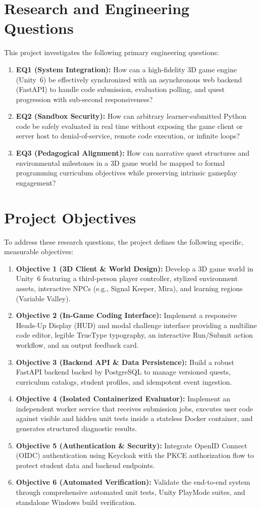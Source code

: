 \section{Research and Engineering Questions}
This project investigates the following primary engineering questions:
\begin{enumerate}
    \item \textbf{EQ1 (System Integration):} How can a high-fidelity 3D game engine (Unity~6) be effectively synchronized with an asynchronous web backend (FastAPI) to handle code submission, evaluation polling, and quest progression with sub-second responsiveness?
    \item \textbf{EQ2 (Sandbox Security):} How can arbitrary learner-submitted Python code be safely evaluated in real time without exposing the game client or server host to denial-of-service, remote code execution, or infinite loops?
    \item \textbf{EQ3 (Pedagogical Alignment):} How can narrative quest structures and environmental milestones in a 3D game world be mapped to formal programming curriculum objectives while preserving intrinsic gameplay engagement?
\end{enumerate}

\section{Project Objectives}
To address these research questions, the project defines the following specific, measurable objectives:
\begin{enumerate}
    \item \textbf{Objective 1 (3D Client \& World Design):} Develop a 3D game world in Unity~6 featuring a third-person player controller, stylized environment assets, interactive NPCs (e.g., Signal Keeper, Mira), and learning regions (Variable Valley).
    \item \textbf{Objective 2 (In-Game Coding Interface):} Implement a responsive Heads-Up Display (HUD) and modal challenge interface providing a multiline code editor, legible TrueType typography, an interactive Run/Submit action workflow, and an output feedback card.
    \item \textbf{Objective 3 (Backend API \& Data Persistence):} Build a robust FastAPI backend backed by PostgreSQL to manage versioned quests, curriculum catalogs, student profiles, and idempotent event ingestion.
    \item \textbf{Objective 4 (Isolated Containerized Evaluator):} Implement an independent worker service that receives submission jobs, executes user code against visible and hidden unit tests inside a stateless Docker container, and generates structured diagnostic results.
    \item \textbf{Objective 5 (Authentication \& Security):} Integrate OpenID Connect (OIDC) authentication using Keycloak with the PKCE authorization flow to protect student data and backend endpoints.
    \item \textbf{Objective 6 (Automated Verification):} Validate the end-to-end system through comprehensive automated unit tests, Unity PlayMode suites, and standalone Windows build verification.
\end{enumerate}

